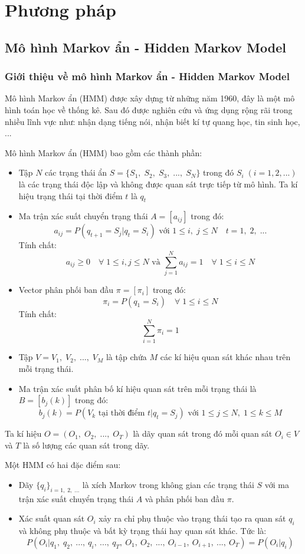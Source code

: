 \setcounter{chapter}{1}
\chapter{Phương pháp}
\section{Mô hình Markov ẩn - Hidden Markov Model}
\subsection{Giới thiệu về mô hình Markov ẩn - Hidden Markov Model}
Mô hình Markov ẩn (HMM) được xây dựng từ những năm 1960, đây là một mô hình toán học về thống kê. Sau đó được nghiên cứu và ứng dụng rộng rãi trong nhiều lĩnh vực như: nhận dạng tiếng nói, nhận biết kí tự quang học, tin sinh học, ...

Mô hình Markov ẩn (HMM) bao gồm các thành phần:
\begin{itemize}
	\item Tập $N$ các trạng thái ẩn $S=\{S_1,\;S_2,\;S_3,\;..., \;S_N\}$ trong đó $S_i \; (i=1, 2, ...)$ là các trạng thái độc lập và không được quan sát trực tiếp từ mô hình. Ta kí hiệu trạng thái tại thời điểm $t$ là $q_t$
	\item Ma trận xác suất chuyển trạng thái $A = [a_{ij}]$ trong đó:
	$$a_{ij}=P(q_{t+1}=S_j|q_t=S_i)\text{ với }1 \leq i,\; j \leq N \quad t=1,\;2,\;...$$
	Tính chất:
	$$a_{ij} \geq 0 \quad \forall \; 1 \leq i, j \leq N \text{ và }\sum_{j=1}^{N} a_{ij}=1 \quad \forall \; 1\leq i\leq N$$
	\newpage
	\item Vector phân phối ban đầu $\pi = [\pi_i]$ trong đó:
	$$\pi_i = P(q_1=S_i) \quad \forall \; 1 \leq i \leq N $$
	Tính chất: $$\sum_{i=1}^{N}\pi_i=1$$
	\item Tập $V={V_1,\;V_2,\; ...,\; V_M}$ là tập chứa $M$ các kí hiệu quan sát khác nhau trên mỗi trạng thái.
	\item Ma trận xác suất phân bố kí hiệu quan sát trên mỗi trạng thái là $B=[b_j(k)]$ trong đó:
	$$b_j(k) = P(V_k \text{ tại thời điểm } t|q_t=S_j) \text{ với } 1\leq j \leq N, \; 1 \leq k \leq M$$
\end{itemize}

Ta kí hiệu $O=(O_1,\; O_2,\; ...,\; O_T)$ là dãy quan sát trong đó mỗi quan sát $O_i \in V$ và $T$ là số lượng các quan sát trong dãy.

Một HMM có hai đặc điểm sau:
\begin{itemize}
	\item Dãy $\{q_i\}_{i=1,\;2,\;...}$ là xích Markov trong không gian các trạng thái $S$ với ma trận xác suất chuyển trạng thái $A$ và phân phối ban đầu $\pi$.
	\item Xác suất quan sát $O_i$ xảy ra chỉ phụ thuộc vào trạng thái tạo ra quan sát $q_i$ và không phụ thuộc và bất kỳ trạng thái hay quan sát khác. Tức là:
	$$P(O_i|q_1,\; q_2,\ ...,\  q_i,\  ...,\  q_T,\  O_1,\  O_2,\  ...,\  O_{i-1},\ O_{i+1},\  ...,\  O_T) = P(O_i|q_i)$$
\end{itemize}

